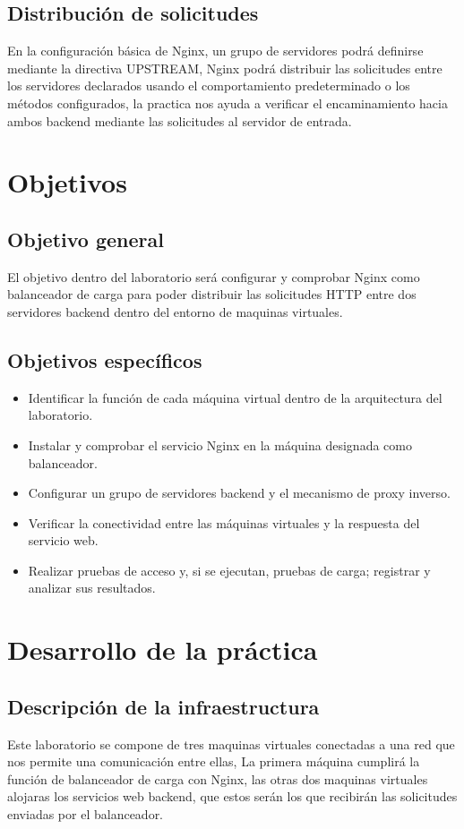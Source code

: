 \documentclass[12pt,letterpaper]{article}
\begin{document}
\subsection{Distribución de solicitudes}
En la configuración básica de Nginx, un grupo de servidores podrá definirse mediante la directiva UPSTREAM, Nginx podrá distribuir las solicitudes entre los servidores declarados usando el comportamiento predeterminado o los métodos configurados, la practica nos ayuda a verificar el encaminamiento hacia ambos backend mediante las solicitudes al servidor de entrada.


\section{Objetivos}
\subsection{Objetivo general}
El objetivo dentro del laboratorio será configurar y comprobar Nginx como balanceador de carga para poder distribuir las solicitudes HTTP entre dos servidores backend dentro del entorno de maquinas virtuales.


\subsection{Objetivos específicos}
\begin{itemize}
    \item Identificar la función de cada máquina virtual dentro de la arquitectura del laboratorio.
    \item Instalar y comprobar el servicio Nginx en la máquina designada como balanceador.
    \item Configurar un grupo de servidores backend y el mecanismo de proxy inverso.
    \item Verificar la conectividad entre las máquinas virtuales y la respuesta del servicio web.
    \item Realizar pruebas de acceso y, si se ejecutan, pruebas de carga; registrar y analizar sus resultados.
\end{itemize}


\section{Desarrollo de la práctica}
\subsection{Descripción de la infraestructura}
Este laboratorio se compone de tres maquinas virtuales conectadas a una red que nos permite una comunicación entre ellas, La primera máquina cumplirá la función de balanceador de carga con Nginx, las otras dos maquinas virtuales alojaras los servicios web backend, que estos serán los que recibirán las solicitudes enviadas por el balanceador.
\end{document}
